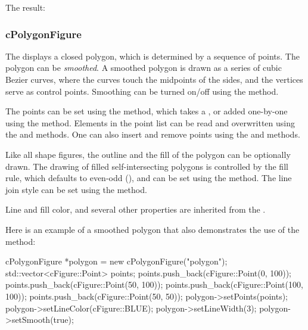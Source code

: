 
The result:

\begin{center}

\end{center}


\subsubsection{cPolygonFigure}
\label{sec:graphics:polygonfigure}

The  displays a closed polygon, which is determined by a sequence of points.
The polygon can be \textit{smoothed}. A smoothed polygon is drawn as a series
of cubic Bezier curves, where the curves touch the midpoints of the sides,
and the vertices serve as control points. Smoothing can be turned on/off
using the  method.

The points can be set using the  method, which takes a ,
or added one-by-one using the  method. Elements in the point list can be
read and overwritten using the  and  methods. One can also
insert and remove points using the  and  methods.

Like all shape figures, the outline and the fill of the polygon can be optionally drawn.
The drawing of filled self-intersecting polygons is controlled
by the fill rule, which defaults to even-odd (), and
can be set using the  method. The line join style can be set using
the  method.

Line and fill color, and several other properties are inherited from
the .

Here is an example of a smoothed polygon that also demonstrates
the use of the  method:

\begin{cpp}
cPolygonFigure *polygon = new cPolygonFigure("polygon");
std::vector<cFigure::Point> points;
points.push_back(cFigure::Point(0, 100));
points.push_back(cFigure::Point(50, 100));
points.push_back(cFigure::Point(100, 100));
points.push_back(cFigure::Point(50, 50));
polygon->setPoints(points);
polygon->setLineColor(cFigure::BLUE);
polygon->setLineWidth(3);
polygon->setSmooth(true);
\end{cpp}


